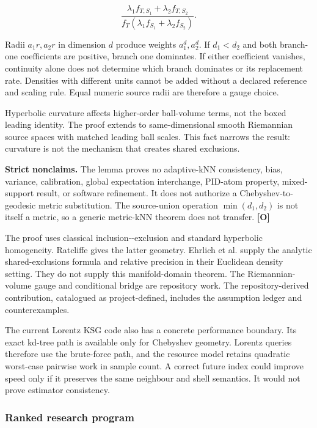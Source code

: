 \documentclass[
  11pt,
  a4paper,
]{article}
\begin{document}
\[
\frac{\lambda_1f_{T,S_1}+\lambda_2f_{T,S_2}}
{f_T(\lambda_1f_{S_1}+\lambda_2f_{S_2})}.
\]

Radii \(a_1r,a_2r\) in dimension \(d\) produce weights \(a_1^d,a_2^d\).
If \(d_1<d_2\) and both branch-one coefficients are positive, branch one
dominates. If either coefficient vanishes, continuity alone does not
determine which branch dominates or its replacement rate. Densities with
different units cannot be added without a declared reference and scaling
rule. Equal numeric source radii are therefore a gauge choice.

Hyperbolic curvature affects higher-order ball-volume terms, not the
boxed leading identity. The proof extends to same-dimensional smooth
Riemannian source spaces with matched leading ball scales. This fact
narrows the result: curvature is not the mechanism that creates shared
exclusions.

\textbf{Strict nonclaims.} The lemma proves no adaptive-kNN consistency,
bias, variance, calibration, global expectation interchange, PID-atom
property, mixed-support result, or software refinement. It does not
authorize a Chebyshev-to-geodesic metric substitution. The source-union
operation \(\min(d_1,d_2)\) is not itself a metric, so a generic
metric-kNN theorem does not transfer. \textbf{{[}O{]}}

The proof uses classical inclusion-\/-exclusion and standard hyperbolic
homogeneity. Ratcliffe gives the latter geometry. Ehrlich et al. supply
the analytic shared-exclusions formula and relative precision in their
Euclidean density setting. They do not supply this manifold-domain
theorem. The Riemannian-volume gauge and conditional bridge are
repository work. The repository-derived contribution, catalogued as
project-defined, includes the assumption ledger and counterexamples.

The current Lorentz KSG code also has a concrete performance boundary.
Its exact kd-tree path is available only for Chebyshev geometry. Lorentz
queries therefore use the brute-force path, and the resource model
retains quadratic worst-case pairwise work in sample count. A correct
future index could improve speed only if it preserves the same neighbour
and shell semantics. It would not prove estimator consistency.

\subsubsection{Ranked research program}\label{ranked-research-program}
\end{document}

